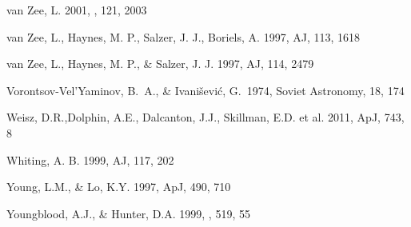 \documentclass[12pt,onecolumn]{emulateapj}
\begin{document}
\begin{thebibliography}{}
van Zee, L. 2001, \aj , 121, 2003

van Zee, L., Haynes, M. P., Salzer, J. J., Boriels, A. 1997, AJ, 113, 1618

van Zee, L., Haynes, M. P., \& Salzer, J. J. 1997, AJ, 114, 2479

Vorontsov-Vel'Yaminov, B.~A., \& 
Ivani{\v s}evi{\'c}, G.\ 1974, Soviet Astronomy, 18, 174 

Weisz, D.R.,Dolphin, A.E., Dalcanton, J.J., Skillman, E.D. et al. 2011, ApJ, 743, 8

Whiting, A. B. 1999, AJ, 117, 202

Young, L.M., \& Lo, K.Y. 1997, ApJ, 490, 710
 
Youngblood, A.J., \& Hunter, D.A. 1999, \apj , 519, 55

\end{thebibliography}
\end{document}
